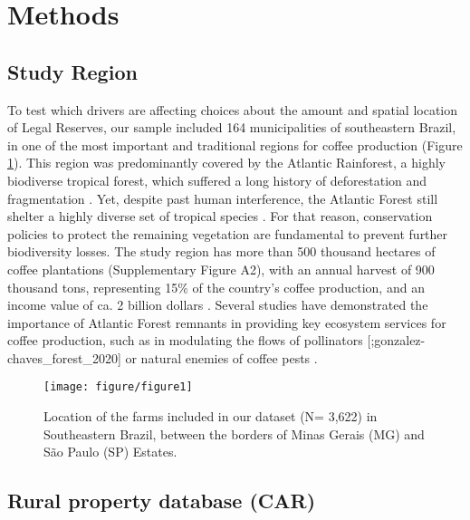 \documentclass[
	12pt,				%
	oneside,			%
	a4paper,			%
	chapter=TITLE,		%
	section=TITLE,		%
	brazil,			%
	english				%
	]{abntex2}
\begin{document}
\hypertarget{methods}{%
\section{Methods}\label{methods}}

\hypertarget{study-region}{%
\subsection{Study Region}\label{study-region}}

To test which drivers are affecting choices about the amount and spatial location of Legal Reserves, our sample included 164 municipalities of southeastern Brazil, in one of the most important and traditional regions for coffee production (Figure \ref{fig:Figure1}). This region was predominantly covered by the Atlantic Rainforest, a highly biodiverse tropical forest, which suffered a long history of deforestation and fragmentation \autocite{joly_experiences_2014}. Yet, despite past human interference, the Atlantic Forest still shelter a highly diverse set of tropical species \autocite{mittermeier_global_2011}. For that reason, conservation policies to protect the remaining vegetation are fundamental to prevent further biodiversity losses. The study region has more than 500 thousand hectares of coffee plantations (Supplementary Figure A2), with an annual harvest of 900 thousand tons, representing 15\% of the country's coffee production, and an income value of ca. 2 billion dollars \autocite{ibge_area_2016}. Several studies have demonstrated the importance of Atlantic Forest remnants in providing key ecosystem services for coffee production, such as in modulating the flows of pollinators {[}\textcite{saturni_landscape_2016};gonzalez-chaves\_forest\_2020{]} or natural enemies of coffee pests \autocite{aristizabal_landscape_2019,libran-embid_effects_2017}.
\begin{figure}[H]

{\centering \texttt{[image: figure/figure1]} 

}

\caption{Location of the farms included in our dataset (N= 3,622) in Southeastern Brazil, between the borders of Minas Gerais (MG) and São Paulo (SP) Estates.}\label{fig:Figure1}
\end{figure}
\hypertarget{rural-property-database-car}{%
\subsection{Rural property database (CAR)}\label{rural-property-database-car}}
\end{document}
